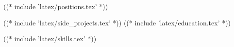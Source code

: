 \documentclass[10pt]{barag_resume}
\begin{document}
    ((* include 'latex/positions.tex' *))

    ((* include 'latex/side_projects.tex' *))
    \newpage %
    ((* include 'latex/education.tex' *))

    ((* include 'latex/skills.tex' *))
\end{document}
